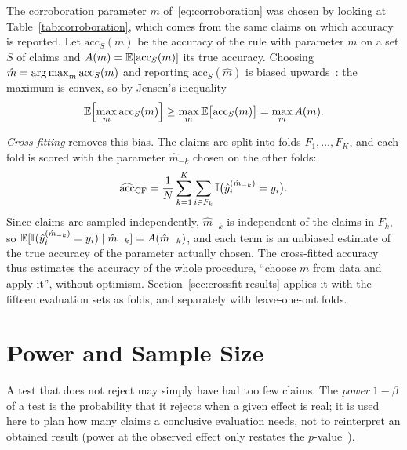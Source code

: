 The corroboration parameter $m$ of~\eqref{eq:corroboration} was chosen by looking at Table~\ref{tab:corroboration}, which comes from the same claims on which accuracy is reported. Let $\text{acc}_S(m)$ be the accuracy of the rule with parameter $m$ on a set $S$ of claims and $A(m) = \mathbb{E}[\text{acc}_S(m)]$ its true accuracy. Choosing $\hat{m} = \operatorname*{arg\,max}_m \text{acc}_S(m)$ and reporting $\text{acc}_S(\hat{m})$ is biased upwards~\citep{varma2006bias}: the maximum is convex, so by Jensen's inequality
\begin{equation}
  \mathbb{E}\Bigl[ \max_m \text{acc}_S(m) \Bigr] \ge \max_m \mathbb{E}\bigl[ \text{acc}_S(m) \bigr] = \max_m A(m).
\end{equation}

\emph{Cross-fitting} removes this bias. The claims are split into folds $F_1, \dots, F_K$, and each fold is scored with the parameter $\hat{m}_{-k}$ chosen on the other folds:
\begin{equation}
  \widehat{\text{acc}}_{\text{CF}} = \frac{1}{N} \sum_{k=1}^{K} \sum_{i \in F_k} \mathbb{I}\bigl( \hat{y}_i^{(\hat{m}_{-k})} = y_i \bigr).
\end{equation}
Since claims are sampled independently, $\hat{m}_{-k}$ is independent of the claims in $F_k$, so $\mathbb{E}[\mathbb{I}(\hat{y}_i^{(\hat{m}_{-k})} = y_i) \mid \hat{m}_{-k}] = A(\hat{m}_{-k})$, and each term is an unbiased estimate of the true accuracy of the parameter actually chosen. The cross-fitted accuracy thus estimates the accuracy of the whole procedure, ``choose $m$ from data and apply it'', without optimism. Section~\ref{sec:crossfit-results} applies it with the fifteen evaluation sets as folds, and separately with leave-one-out folds.

\section{Power and Sample Size}
\label{sec:power}

A test that does not reject may simply have had too few claims. The \emph{power} $1 - \beta$ of a test is the probability that it rejects when a given effect is real; it is used here to plan how many claims a conclusive evaluation needs, not to reinterpret an obtained result (power at the observed effect only restates the $p$-value~\citep{hoenig2001abuse}).

